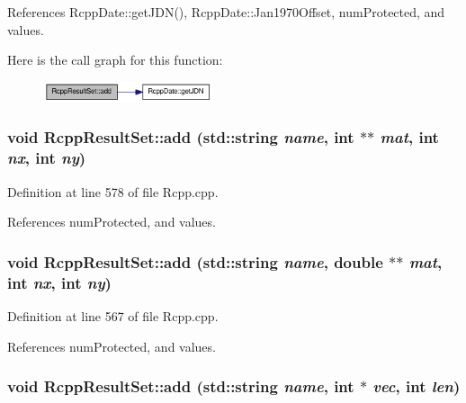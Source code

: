 References RcppDate::getJDN(), RcppDate::Jan1970Offset, numProtected, and values.

Here is the call graph for this function:\nopagebreak
\begin{figure}[H]
\begin{center}
\leavevmode
\includegraphics[width=141pt]{classRcppResultSet_ae5cb861a0d6e95cc7ed465ccae2ac4a7_cgraph}
\end{center}
\end{figure}
\hypertarget{classRcppResultSet_a2cca9ea4e9554c4fad9bc326355c354c}{
\subsubsection[{add}]{\setlength{\rightskip}{0pt plus 5cm}void RcppResultSet::add (std::string {\em name}, \/  int $\ast$$\ast$ {\em mat}, \/  int {\em nx}, \/  int {\em ny})}}
\label{classRcppResultSet_a2cca9ea4e9554c4fad9bc326355c354c}


Definition at line 578 of file Rcpp.cpp.

References numProtected, and values.\hypertarget{classRcppResultSet_a88ff0e3db486eec0012eb58beee05e9b}{
\subsubsection[{add}]{\setlength{\rightskip}{0pt plus 5cm}void RcppResultSet::add (std::string {\em name}, \/  double $\ast$$\ast$ {\em mat}, \/  int {\em nx}, \/  int {\em ny})}}
\label{classRcppResultSet_a88ff0e3db486eec0012eb58beee05e9b}


Definition at line 567 of file Rcpp.cpp.

References numProtected, and values.\hypertarget{classRcppResultSet_a494dbe1f6db48bf48e9e33a32d897f29}{
\subsubsection[{add}]{\setlength{\rightskip}{0pt plus 5cm}void RcppResultSet::add (std::string {\em name}, \/  int $\ast$ {\em vec}, \/  int {\em len})}}
\label{classRcppResultSet_a494dbe1f6db48bf48e9e33a32d897f29}


